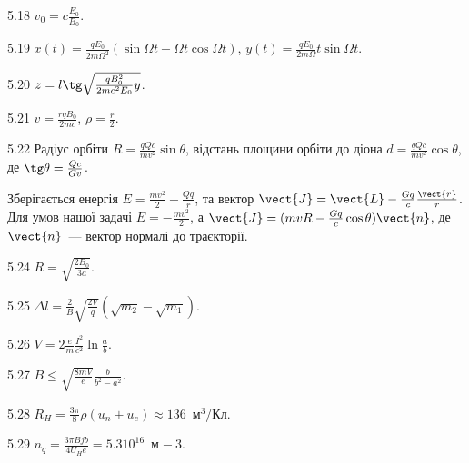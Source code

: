 \begin{Solution}{5.{18}}
	$v_0 = c\frac{E_0}{B_0}$.
\end{Solution}
\begin{Solution}{5.{19}}
	$x(t)  = \frac{qE_0}{2m\Omega^2}\left( \sin\Omega t - \Omega t\cos\Omega t \right) $,
	$y(t)  = \frac{qE_0}{2m\Omega}t\sin\Omega t$.
\end{Solution}
\begin{Solution}{5.{20}}
	$z = l\tg\sqrt{\frac{qB_0^2}{2mc^2E_0}y}$.
\end{Solution}
\begin{Solution}{5.{21}}
	$v = \frac{rqB_0}{2mc}$, $\rho = \frac{r}{2}$.
\end{Solution}
\begin{Solution}{5.{22}}
	Радіус орбіти $R = \frac{qQc}{mv^2}\sin\theta$, відстань площини орбіти до діона $d = \frac{qQc}{mv^2}\cos\theta$, де $\tg\theta = \frac{Q c}{G v}$.

	Зберігається енергія $E = \frac{mv^2}{2} - \frac{Qq}{r}$, та вектор $\vect{J} = \vect{L} - \frac{Gq}{c}\frac{\vect{r}}{r} $. Для умов нашої задачі $E = -\frac{mv^2}{2}$, а $\vect{J} = (mvR - \frac{Gq}{c}\cos\theta) \vect{n} $, де $\vect{n}$~--- вектор нормалі до траєкторії.
\end{Solution}
\begin{Solution}{5.{24}}
	$R = \sqrt{\frac{2B_0}{3a}}.$
\end{Solution}
\begin{Solution}{5.{25}}
	$\Delta l = \frac{2}{B}\sqrt{\frac{2V}{q}} \left( \sqrt{m_2} - \sqrt{m_1} \right) $.
\end{Solution}
\begin{Solution}{5.{26}}
	$V = 2\frac{e}{m}\frac{I^2}{c^2}\ln\frac{a}{b}$.
\end{Solution}
\begin{Solution}{5.{27}}
	$B \le \sqrt{\frac{8mV}{e}} \frac{b}{b^2 - a^2}$.
\end{Solution}
\begin{Solution}{5.{28}}
$R_H = \frac{3\pi}8 \rho (u_n + u_e) \approx 136$~м$^3$/Кл.
\end{Solution}
\begin{Solution}{5.{29}}
$n_q = \frac{3\pi B j b}{4U_H e} = 5.3 10^{16}$~м$^{}-3$.
\end{Solution}
